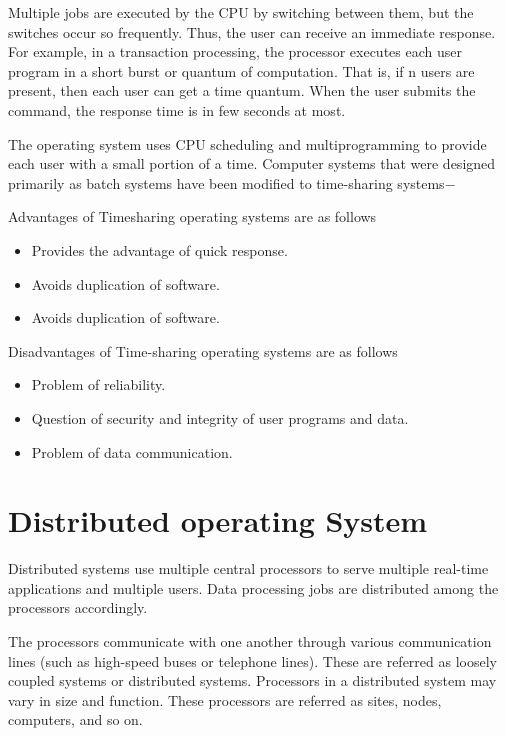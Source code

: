 \documentclass[a4paper,10pt]{article}
\begin{document}
Multiple jobs are executed by the CPU by switching between them, but the switches occur so frequently. Thus, the user can receive an immediate response. For example, in a transaction processing, the processor executes each user program in a short burst or quantum of computation. That is, if n users are present, then each user can get a time quantum. When the user submits the command, the response time is in few seconds at most.

The operating system uses CPU scheduling and multiprogramming to provide each user with a small portion of a time. Computer systems that were designed primarily as batch systems have been modified to time-sharing systems$-$  


{\large Advantages of Timesharing operating systems are as follows}

 \begin{itemize}
   \item Provides the advantage of quick response.
   \item Avoids duplication of software.
   \item Avoids duplication of software.
 \end{itemize}
 
 {\large Disadvantages of Time-sharing operating systems are as follows}
   \begin{itemize}
     \item Problem of reliability.
     \item Question of security and integrity of user programs and data.
     \item Problem of data communication.
   \end{itemize}
   \newpage
 \section{Distributed operating System}
 Distributed systems use multiple central processors to serve multiple real-time applications and multiple users. Data processing jobs are distributed among the processors accordingly.
 
 The processors communicate with one another through various communication lines (such as high-speed buses or telephone lines). These are referred as loosely coupled systems or distributed systems. Processors in a distributed system may vary in size and function. These processors are referred as sites, nodes, computers, and so on.
 
\end{document}
